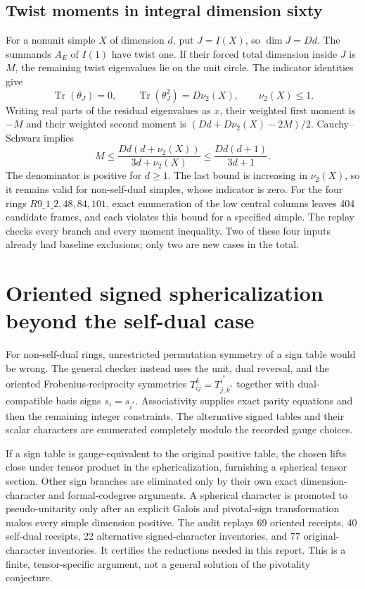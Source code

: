 \documentclass[11pt]{article}
\begin{document}
\subsection{Twist moments in integral dimension sixty}
For a nonunit simple $X$ of dimension $d$, put $J=I(X)$, so $\dim J=Dd$.
The summands $A_E$ of $I(1)$ have twist one. If their forced total dimension
inside $J$ is $M$, the remaining twist eigenvalues lie on the unit circle.
The indicator identities \cite{NgSchauenburg} give
\[
 \operatorname{Tr}(\theta_J)=0,\qquad
 \operatorname{Tr}(\theta_J^2)=D\nu_2(X),\qquad \nu_2(X)\leq1.
\]
Writing real parts of the residual eigenvalues as $x$, their weighted first
moment is $-M$ and their weighted second moment is
$(Dd+D\nu_2(X)-2M)/2$. Cauchy--Schwarz implies
\[
 M\leq\frac{Dd(d+\nu_2(X))}{3d+\nu_2(X)}
 \leq\frac{Dd(d+1)}{3d+1}.
\]
The denominator is positive for $d\geq1$. The last bound is increasing in
$\nu_2(X)$, so it remains valid for non-self-dual simples, whose indicator
is zero. For the four rings $R9\_1\_2,48,84,101$, exact enumeration of
the low central columns leaves 404 candidate frames, and each violates
this bound for a specified simple. The replay checks every branch and every
moment inequality. Two of these four inputs already had baseline exclusions;
only two are new cases in the total.


\section{Oriented signed sphericalization beyond the self-dual case}
For non-self-dual rings, unrestricted permutation symmetry of a sign table
would be wrong. The general checker instead uses the unit, dual reversal,
and the oriented Frobenius-reciprocity symmetries
$T_{ij}^{k}=T_{j,k^*}^{i^*}$ together with dual-compatible basis signs
$s_i=s_{i^*}$. Associativity supplies exact parity equations and then the
remaining integer constraints. The alternative signed tables and their scalar
characters are enumerated completely modulo the recorded gauge choices.

If a sign table is gauge-equivalent to the original positive table, the
chosen lifts close under tensor product in the sphericalization, furnishing
a spherical tensor section. Other sign branches are eliminated only by
their own exact dimension-character and formal-codegree arguments. A
spherical character is promoted to pseudo-unitarity only after an explicit
Galois and pivotal-sign transformation makes every simple dimension positive.
The audit replays 69 oriented receipts, 40 self-dual receipts, 22 alternative
signed-character inventories, and 77 original-character inventories. It
certifies the reductions needed in this report. This is a finite, tensor-specific
argument, not a general solution of the pivotality conjecture.
\end{document}
